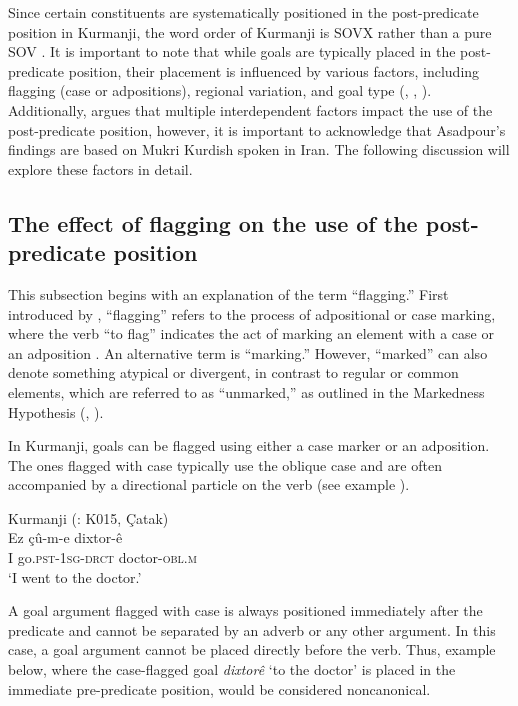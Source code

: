 Since certain constituents are systematically positioned in the post-predicate position in Kurmanji, the word order of Kurmanji is SOVX rather than a pure SOV \citep{Haig2014}. It is important to note that while goals are typically placed in the post-predicate position, their placement is influenced by various factors, including flagging (case or adpositions), regional variation, and goal type (\citealt{Haig2014}, \citealt{HaigThiele2014}, \citealt{Gundogdu2019}). Additionally, \citet{Asadpour2021} argues that multiple interdependent factors impact the use of the post-predicate position, however, it is important to acknowledge that Asadpour’s findings are based on Mukri Kurdish spoken in Iran. The following discussion will explore these factors in detail.

\subsection{The effect of flagging on the use of the post-predicate position}\label{sec:key:3.3.1}

This subsection begins with an explanation of the term “flagging.” First introduced by \citet{Haspelmath2005}, “flagging” refers to the process of adpositional or case marking, where the verb “to flag” indicates the act of marking an element with a case or an adposition \citep{Haspelmath2019}. An alternative term is “marking.” However, “marked” can also denote something atypical or divergent, in contrast to regular or common elements, which are referred to as “unmarked,” as outlined in the Markedness Hypothesis (\citealt{Jakobson1932, jakobson_beitrag_1971}, \citealt{Greenberg1980}).

In Kurmanji, goals can be flagged using either a case marker or an adposition. The ones flagged with case typically use the oblique case and are often accompanied by a directional particle on the verb (see example ).

\ea%
  \label{ex:key:12} Kurmanji (\citealt{Matras2016}: K015, Çatak)\\
\gll Ez  çû-m-e      dixtor-ê \\
I  go.\textsc{pst-1sg-drct}  doctor\textsc{-obl.m}\\
\glt ‘I went to the doctor.’ 
  \z

A goal argument flagged with case is always positioned immediately after the predicate and cannot be separated by an adverb or any other argument. In this case, a goal argument cannot be placed directly before the verb. Thus, example  below, where the case-flagged goal \textit{dixtorê} ‘to the doctor’ is placed in the immediate pre-predicate position, would be considered noncanonical.

